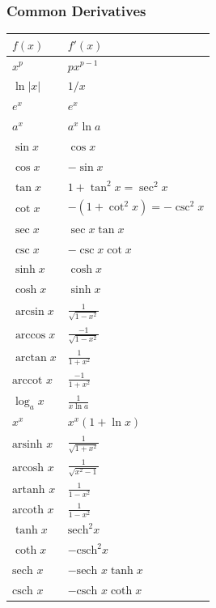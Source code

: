 \subsubsection{Common Derivatives}
\begin{center}
\footnotesize
\setlength{\tabcolsep}{2pt}
\begin{tabularx}{\columnwidth}{|>{\hsize=0.8\hsize\raggedright\arraybackslash}X|>{\hsize=1.2\hsize\raggedright\arraybackslash}X|}
\hline
$f(x)$ & $f'(x)$ \\ \hline
$x^p$ & $p x^{p-1}$ \\ \hline
$\ln|x|$ & $1/x$ \\ \hline
$e^x$ & $e^x$ \\ \hline
$a^x$ & $a^x \ln a$ \\ \hline
$\sin x$ & $\cos x$ \\ \hline
$\cos x$ & $-\sin x$ \\ \hline
$\tan x$ & $1+\tan^2 x = \sec^2 x$ \\ \hline
$\cot x$ & $-(1+\cot^2 x) = -\csc^2 x$ \\ \hline
$\sec x$ & $\sec x \tan x$ \\ \hline
$\csc x$ & $-\csc x \cot x$ \\ \hline
$\sinh x$ & $\cosh x$ \\ \hline
$\cosh x$ & $\sinh x$ \\ \hline
$\arcsin x$ & $\frac{1}{\sqrt{1-x^2}}$ \\ \hline
$\arccos x$ & $\frac{-1}{\sqrt{1-x^2}}$ \\ \hline
$\arctan x$ & $\frac{1}{1+x^2}$ \\ \hline
$\text{arccot } x$ & $\frac{-1}{1+x^2}$ \\ \hline
$\log_a x$ & $\frac{1}{x \ln a}$ \\ \hline
$x^x$ & $x^x(1+\ln x)$ \\ \hline
$\text{arsinh } x$ & $\frac{1}{\sqrt{1+x^2}}$ \\ \hline
$\text{arcosh } x$ & $\frac{1}{\sqrt{x^2-1}}$ \\ \hline
$\text{artanh } x$ & $\frac{1}{1-x^2}$ \\ \hline
$\text{arcoth } x$ & $\frac{1}{1-x^2}$ \\ \hline
$\tanh x$ & $\text{sech}^2 x$ \\ \hline
$\coth x$ & $-\text{csch}^2 x$ \\ \hline
$\text{sech } x$ & $-\text{sech } x \tanh x$ \\ \hline
$\text{csch } x$ & $-\text{csch } x \coth x$ \\ \hline

\end{tabularx}
\end{center}

